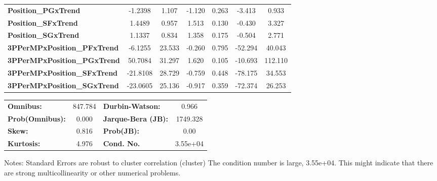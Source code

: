 \begin{center}
\begin{tabular}{lcccccc}
\textbf{Position\_PGxTrend}         &      -1.2398  &        1.107     &    -1.120  &         0.263        &       -3.413    &        0.933     \\
\textbf{Position\_SFxTrend}         &       1.4489  &        0.957     &     1.513  &         0.130        &       -0.430    &        3.327     \\
\textbf{Position\_SGxTrend}         &       1.1337  &        0.834     &     1.358  &         0.175        &       -0.504    &        2.771     \\
\textbf{3PPerMPxPosition\_PFxTrend} &      -6.1255  &       23.533     &    -0.260  &         0.795        &      -52.294    &       40.043     \\
\textbf{3PPerMPxPosition\_PGxTrend} &      50.7084  &       31.297     &     1.620  &         0.105        &      -10.693    &      112.110     \\
\textbf{3PPerMPxPosition\_SFxTrend} &     -21.8108  &       28.729     &    -0.759  &         0.448        &      -78.175    &       34.553     \\
\textbf{3PPerMPxPosition\_SGxTrend} &     -23.0605  &       25.136     &    -0.917  &         0.359        &      -72.374    &       26.253     \\
\bottomrule
\end{tabular}
\begin{tabular}{lclc}
\textbf{Omnibus:}       & 847.784 & \textbf{  Durbin-Watson:     } &    0.966  \\
\textbf{Prob(Omnibus):} &   0.000 & \textbf{  Jarque-Bera (JB):  } & 1749.328  \\
\textbf{Skew:}          &   0.816 & \textbf{  Prob(JB):          } &     0.00  \\
\textbf{Kurtosis:}      &   4.976 & \textbf{  Cond. No.          } & 3.55e+04  \\
\bottomrule
\end{tabular}
\end{center}

Notes: \newline
 [1] Standard Errors are robust to cluster correlation (cluster) \newline
 [2] The condition number is large, 3.55e+04. This might indicate that there are \newline
 strong multicollinearity or other numerical problems.